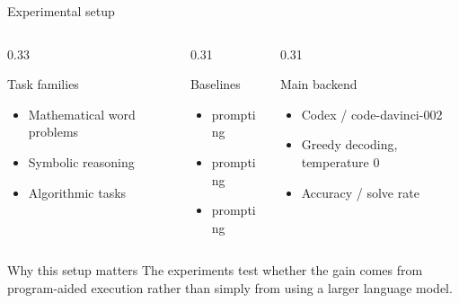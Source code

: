 \begin{frame}{Experimental setup}
\begin{columns}[T,totalwidth=\textwidth]
\begin{column}{0.33\textwidth}
\begin{block}{Task families}
\begin{itemize}
  \item Mathematical word problems
  \item Symbolic reasoning
  \item Algorithmic tasks
\end{itemize}
\end{block}
\end{column}
\begin{column}{0.31\textwidth}
\begin{block}{Baselines}
\begin{itemize}
  \item \Direct{} prompting
  \item \CoT{} prompting
  \item \PAL{} prompting
\end{itemize}
\end{block}
\end{column}
\begin{column}{0.31\textwidth}
\begin{block}{Main backend}
\begin{itemize}
  \item Codex / code-davinci-002
  \item Greedy decoding, temperature 0
  \item Accuracy / solve rate
\end{itemize}
\end{block}
\end{column}
\end{columns}
\vspace{0.25cm}
\begin{exampleblock}{Why this setup matters}
The experiments test whether the gain comes from program-aided execution rather than simply from using a larger language model.
\end{exampleblock}
\end{frame}

